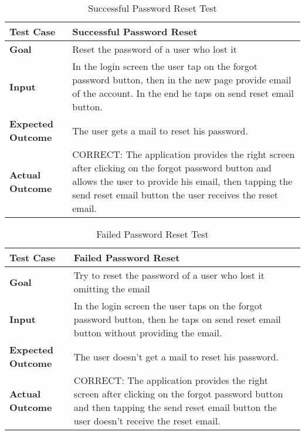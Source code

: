 \begin{table}[H]
	\centering
	\begin{tabular}{|l|l|}
	\hline
	\textbf{Test Case}& Successful Password Reset\\
	\hline
	\textbf{Goal}& Reset the password of a user who lost it\\
	\hline
	\textbf{Input}& 
	\begin{minipage}{.7\linewidth}
	In the login screen the user tap on the forgot password button, then in the new page provide email of the account. In the end he taps on send reset email button.
	\end{minipage}\\
	\hline
	\textbf{Expected Outcome}& The user gets a mail to reset his password.\\
	\hline
	\textbf{Actual Outcome}& 
	\begin{minipage}{.7\linewidth}
	CORRECT: The application provides the right screen after clicking on the forgot password button and allows the user to provide his email, then tapping the send reset email button the user receives the reset email.
	\end{minipage}\\
	\hline	
	\end{tabular}
	\caption{Successful Password Reset Test}
\end{table}

\begin{table}[H]
	\centering
	\begin{tabular}{|l|l|}
	\hline
	\textbf{Test Case}& Failed Password Reset\\
	\hline
	\textbf{Goal}& Try to reset the password of a user who lost it omitting the email\\
	\hline
	\textbf{Input}& 
	\begin{minipage}{.7\linewidth}
	In the login screen the user taps on the forgot password button, then he taps on send reset email button without providing the email.
	\end{minipage}\\
	\hline
	\textbf{Expected Outcome}& The user doesn't get a mail to reset his password.\\
	\hline
	\textbf{Actual Outcome}& 
	\begin{minipage}{.7\linewidth}
	CORRECT: The application provides the right screen after clicking on the forgot password button and then tapping the send reset email button the user doesn't receive the reset email.
	\end{minipage}\\
	\hline	
	\end{tabular}
	\caption{Failed Password Reset Test}
\end{table}

